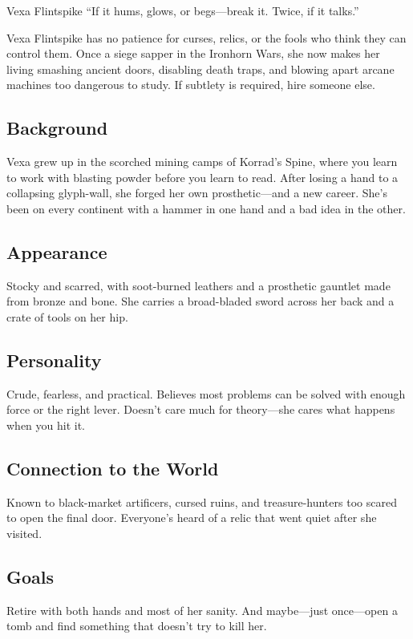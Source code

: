 \newpage
\begin{WyrdCharacterSheet}
    {Vexa Flintspike}
    {“If it hums, glows, or begs—break it. Twice, if it talks.”}
    \label{pc:vexa-flintspike}

    Vexa Flintspike has no patience for curses, relics, or the fools who think they can control them. Once a siege sapper in the Ironhorn Wars, she now makes her living smashing ancient doors, disabling death traps, and blowing apart arcane machines too dangerous to study. If subtlety is required, hire someone else.

    \subsection{Background}
    Vexa grew up in the scorched mining camps of Korrad’s Spine, where you learn to work with blasting powder before you learn to read. After losing a hand to a collapsing glyph-wall, she forged her own prosthetic—and a new career. She’s been on every continent with a hammer in one hand and a bad idea in the other.

    \subsection{Appearance}
    Stocky and scarred, with soot-burned leathers and a prosthetic gauntlet made from bronze and bone. She carries a broad-bladed sword across her back and a crate of tools on her hip.

    \subsection{Personality}
    Crude, fearless, and practical. Believes most problems can be solved with enough force or the right lever. Doesn’t care much for theory—she cares what happens when you hit it.

    \subsection{Connection to the World}
    Known to black-market artificers, cursed ruins, and treasure-hunters too scared to open the final door. Everyone’s heard of a relic that went quiet after she visited.

    \subsection{Goals}
    Retire with both hands and most of her sanity. And maybe—just once—open a tomb and find something that doesn’t try to kill her.


\end{WyrdCharacterSheet}
